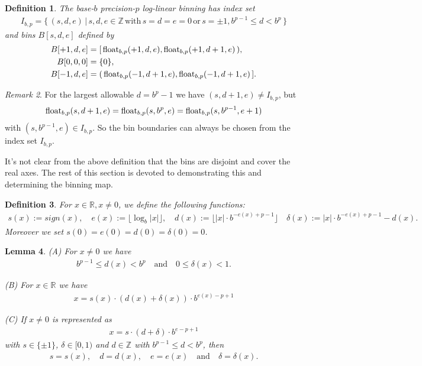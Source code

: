 \documentclass{article}
\theoremstyle{plain}
\newtheorem{definition}{Definition}[section]
\newtheorem{lemma}[definition]{Lemma}
\theoremstyle{remark}
\newtheorem{remark}[definition]{Remark}
\newcommand{\IR}{\mathbb{R}}
\newcommand{\IZ}{\mathbb{Z}}
\newcommand{\qtext}[1]{\quad\text{#1}\quad} %
\newcommand{\floor}[1]{\lfloor#1\rfloor}
\newcommand{\abs}[1]{|#1|}
\begin{document}
\begin{definition} \label{hdrdef}
  The base-$b$ precision-$p$ log-linear binning has index set
  \begin{align*}
    I_{b,p} = \{\, (s,d,e) \,|\, s,d,e \in \IZ \,\text{with}\, s=d=e=0 \,\text{or}\, s=\pm1, b^{p-1} \leq d < b^p \,\}
  \end{align*}
  and bins $B[s,d,e]$ defined by
  \begin{align*}
    B[+1,d,e] &= \mathopen[\,\mathrm{float}_{b,p}(+1,d,e), \mathrm{float}_{b,p}(+1,d+1,e)\,\mathopen), \\
    B[0,0,0]  &= \{ 0 \}, \\
    B[-1,d,e] &= \mathopen(\,\mathrm{float}_{b,p}(-1,d+1,e), \mathrm{float}_{b,p}(-1,d+1,e)\,\mathopen].
  \end{align*}
\end{definition}

\begin{remark} For the largest allowable $d=b^{p}-1$ we have $(s,d+1,e) \neq I_{b,p}$, but
  \begin{align*}
    \mathrm{float}_{b,p}(s,d + 1,e) = \mathrm{float}_{b,p}(s, b^p ,e) = \mathrm{float}_{b,p}(s, b^{p-1}, e+1)
  \end{align*}
  with $(s, b^{p-1}, e) \in I_{b,p}$.
  So the bin boundaries can always be chosen from the index set $I_{b,p}$.
\end{remark}

It's not clear from the above definition that the bins are disjoint and cover the real axes.
The rest of this section is devoted to demonstrating this and determining the binning map.

\begin{definition}
  For $x\in\IR, x\neq 0$, we define the following functions:
  \begin{align*}
    s(x) := sign(x), \quad
    e(x) := \floor{\log_b\abs{x}}, \quad
    d(x) := \floor{\abs{x} \cdot b^{-e(x)+p-1}} \quad
    \delta(x) := \abs{x} \cdot b^{-e(x)+p-1} - d(x).
  \end{align*}
  Moreover we set $s(0) = e(0) = d(0) = \delta(0) = 0$.
\end{definition}

\begin{lemma} \label{floatlem}
  (A) For $x \neq 0$ we have
  \begin{align*}
    b^{p-1} \leq d(x) < b^p \qtext{and} 0 \leq \delta(x) < 1.
  \end{align*}

  (B) For $x \in \IR$ we have
  \begin{align*}
    x = s(x) \cdot (d(x) + \delta(x)) \cdot b^{e(x) - p + 1}
  \end{align*}

  (C) If $x \neq 0$ is represented as
  \begin{align*}
    x = s \cdot (d + \delta) \cdot b^{e - p + 1}
  \end{align*}
  with $s \in \{\pm 1\}$, $\delta \in [0,1)$ and $d \in \IZ$ with $b^{p-1} \leq d < b^p$, then
  \begin{align*}
    s = s(x), \quad d = d(x), \quad e = e(x) \qtext{and} \delta = \delta(x).
  \end{align*}
\end{lemma}
\end{document}
